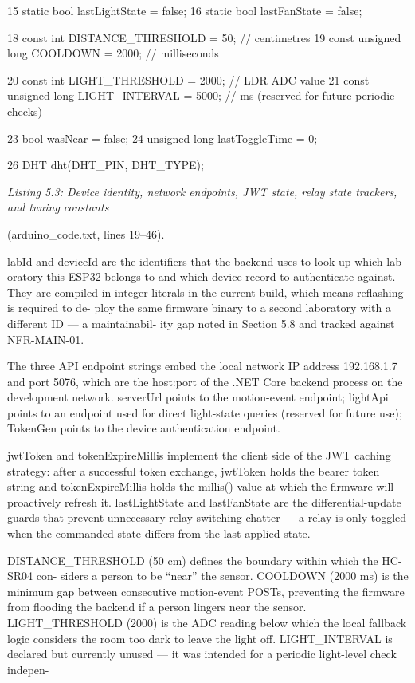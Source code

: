 15 static bool lastLightState = false;
16 static bool lastFanState = false;


18 const int DISTANCE\_THRESHOLD = 50; // centimetres
19 const unsigned long COOLDOWN = 2000; // milliseconds




20 const int LIGHT\_THRESHOLD = 2000; // LDR ADC value
21 const unsigned long LIGHT\_INTERVAL = 5000; // ms (reserved for future periodic
checks)

23 bool wasNear = false;
24 unsigned long lastToggleTime = 0;


26 DHT dht(DHT\_PIN, DHT\_TYPE);


\textit{Listing 5.3: Device identity, network endpoints, JWT state, relay state trackers, and tuning constants}

(arduino\_code.txt, lines 19--46).


labId and deviceId are the identiﬁers that the backend uses to look up which lab-
oratory this ESP32 belongs to and which device record to authenticate against. They are
compiled-in integer literals in the current build, which means reﬂashing is required to de-
ploy the same ﬁrmware binary to a second laboratory with a different ID --- a maintainabil-
ity gap noted in Section 5.8 and tracked against NFR-MAIN-01.

The three API endpoint strings embed the local network IP address 192.168.1.7 and
port 5076, which are the host:port of the .NET Core backend process on the development
network. serverUrl points to the motion-event endpoint; lightApi points to an endpoint
used for direct light-state queries (reserved for future use); TokenGen points to the device
authentication endpoint.

jwtToken and tokenExpireMillis implement the client side of the JWT caching
strategy: after a successful token exchange, jwtToken holds the bearer token string and
tokenExpireMillis holds the millis() value at which the ﬁrmware will proactively
refresh it. lastLightState and lastFanState are the differential-update guards that
prevent unnecessary relay switching chatter --- a relay is only toggled when the commanded
state differs from the last applied state.

DISTANCE\_THRESHOLD (50 cm) deﬁnes the boundary within which the HC-SR04 con-
siders a person to be ``near'' the sensor. COOLDOWN (2000 ms) is the minimum gap between
consecutive motion-event POSTs, preventing the ﬁrmware from ﬂooding the backend if a
person lingers near the sensor. LIGHT\_THRESHOLD (2000) is the ADC reading below which
the local fallback logic considers the room too dark to leave the light off. LIGHT\_INTERVAL
is declared but currently unused --- it was intended for a periodic light-level check indepen-



